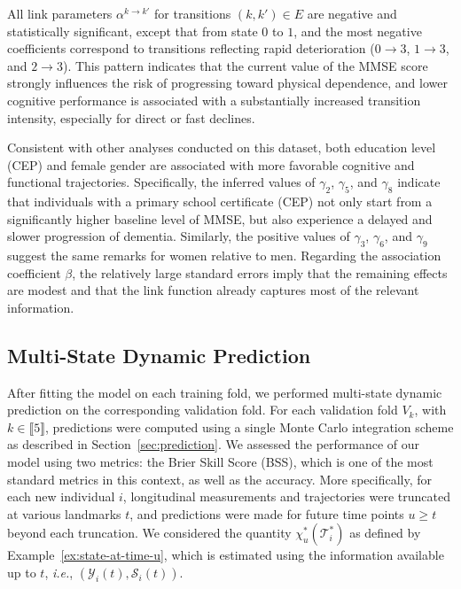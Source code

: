 \documentclass{sn-jnl}
\begin{document}
All link parameters $\alpha^{k \to k'}$ for transitions $(k, k') \in E$ are negative and statistically significant, except that from state $0$ to $1$, and the most negative coefficients correspond to transitions reflecting rapid deterioration ($0 \to 3$, $1 \to 3$, and $2 \to 3$). This pattern indicates that the current value of the MMSE score strongly influences the risk of progressing toward physical dependence, and lower cognitive performance is associated with a substantially increased transition intensity, especially for direct or fast declines.

Consistent with other analyses conducted on this dataset, both education level (CEP) and female gender are associated with more favorable cognitive and functional trajectories. Specifically, the inferred values of $\gamma_2$, $\gamma_5$, and $\gamma_8$ indicate that individuals with a primary school certificate (CEP) not only start from a significantly higher baseline level of MMSE, but also experience a delayed and slower progression of dementia. Similarly, the positive values of $\gamma_3$, $\gamma_6$, and $\gamma_9$ suggest the same remarks for women relative to men. Regarding the association coefficient $\beta$, the relatively large standard errors imply that the remaining effects are modest and that the link function already captures most of the relevant information.

\subsection{Multi-State Dynamic Prediction} \label{subsec:paquid-pred}

After fitting the model on each training fold, we performed multi-state dynamic prediction on the corresponding validation fold. For each validation fold $V_k$, with $k \in \llbracket 5 \rrbracket$, predictions were computed using a single Monte Carlo integration scheme as described in Section~\ref{sec:prediction}. We assessed the performance of our model using two metrics: the Brier Skill Score (BSS), which is one of the most standard metrics in this context, as well as the accuracy. More specifically, for each new individual $i$, longitudinal measurements and trajectories were truncated at various landmarks $t$, and predictions were made for future time points $u \geq t$ beyond each truncation. We considered the quantity $\chi_u^*(\mathcal{T}_i^*)$ as defined by Example~\ref{ex:state-at-time-u}, which is estimated using the information available up to $t$, \textit{i.e.}, $\left( \mathcal{Y}_i(t), \mathcal{S}_i(t) \right)$.
\end{document}
